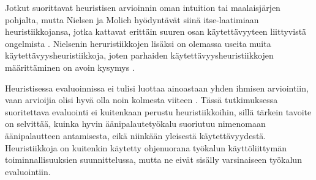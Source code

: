 \documentclass[utf8]{gradu3}
\begin{document}
Jotkut suorittavat heuristisen arvioinnin oman intuition tai maalaisjärjen pohjalta, mutta Nielsen ja Molich hyödyntävät siinä itse-laatimiaan heuristiikkojansa, jotka kattavat erittäin suuren osan käytettävyyteen liittyvistä ongelmista \parencite[][]{heuristic-evaluation}. Nielsenin heruristiikkojen lisäksi on olemassa useita muita käytettävyysheuristiikkoja, joten parhaiden käytettävyysheuristiikkojen määrittäminen on avoin kysymys \parencite[][]{enhancing}. 

Heuristisessa evaluoinnissa ei tulisi luottaa ainoastaan yhden ihmisen arviointiin, vaan arvioijia olisi hyvä olla noin kolmesta viiteen \parencite[][]{heuristic-evaluation}. Tässä tutkimuksessa suoritettava evaluointi ei kuitenkaan perustu heuristiikkoihin, sillä tärkein tavoite on selvittää, kuinka hyvin äänipalautetyökalu suoriutuu nimenomaan äänipalautteen antamisesta, eikä niinkään yleisestä käytettävyydestä. Heuristiikkoja on kuitenkin käytetty ohjenuorana työkalun käyttöliittymän toiminnallisuuksien suunnittelussa, mutta ne eivät sisälly varsinaiseen työkalun evaluointiin.
\end{document}
